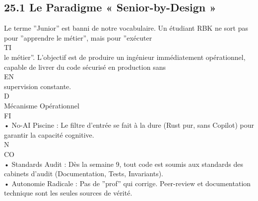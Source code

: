 \documentclass[12pt,landscape,a4paper]{article}
\begin{document}
\subsection{25.1 Le Paradigme « Senior-by-Design »}
Le terme ”Junior” est banni de notre vocabulaire. Un étudiant RBK ne sort pas pour ”apprendre le métier”, mais pour ”exécuter\\
\vspace{0.5em}
\vspace{0.5em}
\vspace{0.5em}
\vspace{0.5em}
TI\\
le métier”. L’objectif est de produire un ingénieur immédiatement opérationnel, capable de livrer du code sécurisé en production sans\\
\vspace{0.5em}
\vspace{0.5em}
\vspace{0.5em}
\vspace{0.5em}
EN\\
supervision constante.\\
\vspace{0.5em}
\vspace{0.5em}
\vspace{0.5em}
\vspace{0.5em}
D\\
Mécanisme Opérationnel\\
\vspace{0.5em}
\vspace{0.5em}
\vspace{0.5em}
\vspace{0.5em}
FI\\
• No-AI Piscine : Le filtre d’entrée se fait à la dure (Rust pur, sans Copilot) pour garantir la capacité cognitive.\\
\vspace{0.5em}
N\\
CO\\
• Standards Audit : Dès la semaine 9, tout code est soumis aux standards des cabinets d’audit (Documentation, Tests, Invariants).\\
\vspace{0.5em}
• Autonomie Radicale : Pas de ”prof” qui corrige. Peer-review et documentation technique sont les seules sources de vérité.\\
\vspace{0.5em}
\vspace{0.5em}
\vspace{0.5em}
\end{document}
